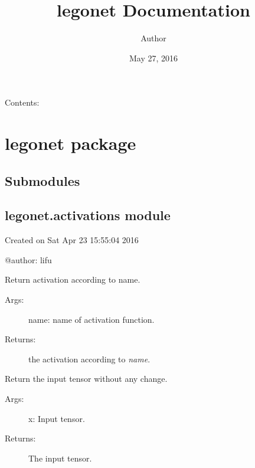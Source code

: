 \documentclass[letterpaper,10pt,english]{sphinxmanual}
\title{legonet Documentation}
\date{May 27, 2016}
\author{Author}
\begin{document}
\maketitle
\tableofcontents
{}\label{index::doc}


Contents:


\chapter{legonet package}
\label{legonet:legonet-package}\label{legonet:welcome-to-legonet-s-documentation}\label{legonet::doc}

\section{Submodules}
\label{legonet:submodules}

\section{legonet.activations module}
\label{legonet:module-legonet.activations}\label{legonet:legonet-activations-module}
Created on Sat Apr 23 15:55:04 2016

@author: lifu

\begin{fulllineitems}
\label{legonet:legonet.activations.get}
Return activation according to name.
\begin{description}
\item[{Args:}] \leavevmode
name: name of activation function.

\item[{Returns:}] \leavevmode
the activation according to \emph{name}.

\end{description}

\end{fulllineitems}


\begin{fulllineitems}
\label{legonet:legonet.activations.identity}
Return the input tensor without any change.
\begin{description}
\item[{Args:}] \leavevmode
x: Input tensor.

\item[{Returns:}] \leavevmode
The input tensor.

\end{description}

\end{fulllineitems}
\end{document}

